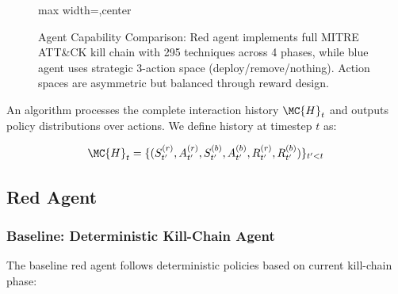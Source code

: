 \documentclass[12pt,oneside]{article}
\begin{document}
\begin{figure}[H]
\begin{adjustbox}{max width=\linewidth,center}
\end{adjustbox}
\caption{Agent Capability Comparison: Red agent implements full MITRE ATT\&CK kill chain with 295 techniques across 4 phases, while blue agent uses strategic 3-action space (deploy/remove/nothing). Action spaces are asymmetric but balanced through reward design.}
\label{fig:agent_capabilities}
\end{figure}

An algorithm processes the complete interaction history $\MC{H}_t$ and outputs policy distributions over actions. We define history at timestep $t$ as:

\begin{equation}
\MC{H}_t = \{(S_{t'}^{(r)}, A_{t'}^{(r)}, S_{t'}^{(b)}, A_{t'}^{(b)}, R_{t'}^{(r)}, R_{t'}^{(b)})\}_{t' < t}
\end{equation}

\subsection{Red Agent}

\subsubsection{Baseline: Deterministic Kill-Chain Agent}
The baseline red agent follows deterministic policies based on current kill-chain phase:
\end{document}
